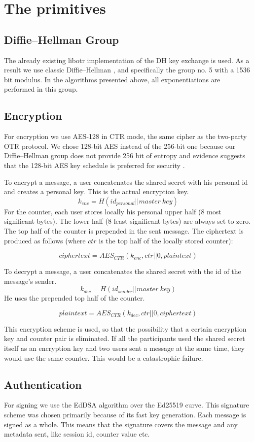 \section{The primitives}

\subsection{Diffie--Hellman Group}
The already existing libotr implementation of the DH key exchange is used.
As a result we use classic Diffie--Hellman , and specifically the group no. 5 \cite{website:dh-rfc} with a 1536 bit modulus.
In the algorithms presented above, all exponentiations are performed in this group.

\subsection{Encryption}
For encryption we use AES-128 in CTR mode, the same cipher as the two-party OTR protocol.
We chose 128-bit AES instead of the 256-bit one because our Diffie--Hellman group does not provide 256 bit of entropy and evidence suggests that the 128-bit AES key schedule is preferred for security \cite{aes-key-recov} \cite{rijndael-improved-analysis}.

To encrypt a message, a user concatenates the shared secret with his personal id and creates a personal key.
This is the actual encryption key.
\[
k_{enc} = H(id_{personal} || master\ key)
\]
For the counter, each user stores locally his personal upper half (8 most significant bytes).
The lower half (8 least significant bytes) are always set to zero.
The top half of the counter is prepended in the sent message.
The ciphertext is produced as follows (where $ctr$ is the top half of the locally stored counter):

\[
ciphertext = AES_{CTR}(k_{enc}, ctr||0, plaintext)
\]

To decrypt a message, a user concatenates the shared secret with the id of the message's sender.
\[
k_{dec} = H(id_{sender} || master\ key)
\]
He uses the prepended top half of the counter.

\[
plaintext = AES_{CTR}(k_{dec}, ctr||0, ciphertext)
\]

This encryption scheme is used, so that the possibility that a certain encryption key and counter pair is eliminated.
If all the participants used the shared secret itself as an encryption key and two users sent a message at the same time, they would use the same counter.
This would be a catastrophic failure.

\subsection{Authentication}
For signing we use the EdDSA algorithm over the Ed25519 curve.
This signature scheme was chosen primarily because of its fast key generation.
Each message is signed as a whole.
This means that the signature covers the message and any metadata sent, like session id, counter value etc.
